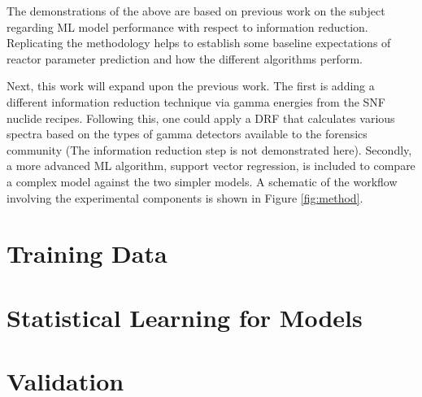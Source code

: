 The demonstrations of the above are based on previous work on the subject
\cite{dayman_feasibility_2013} regarding \gls{ML} model performance
with respect to information reduction.  Replicating the methodology helps to
establish some baseline expectations of reactor parameter prediction and how
the different algorithms perform. 

Next, this work will expand upon the previous work.  The first is adding a
different information reduction technique via gamma energies from the \gls{SNF}
nuclide recipes.  Following this, one could apply a \gls{DRF} that calculates
various spectra based on the types of gamma detectors available to the
forensics community (The information reduction step is not demonstrated here).
Secondly, a more advanced \gls{ML} algorithm, support vector regression, is
included to compare a complex model against the two simpler models.  A
schematic of the workflow involving the experimental components is shown in
Figure \ref{fig:method}.

\section{Training Data}
\label{sec:training}


\section{Statistical Learning for Models}
\label{sec:statmodel}


\section{Validation}
\label{sec:valid}


